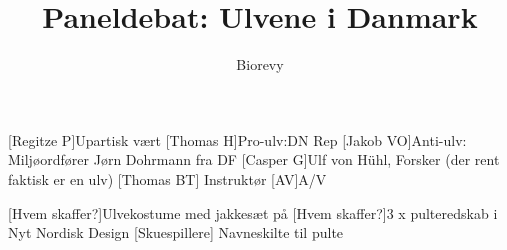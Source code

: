 \documentclass[a4paper,12pt]{article}
\title{Paneldebat: Ulvene i Danmark}
\author{Biorevy}
\begin{document}
\maketitle




\begin{roles}
	[Regitze P]Upartisk vært
	[Thomas H]Pro-ulv:DN Rep
	[Jakob VO]Anti-ulv: Miljøordfører Jørn Dohrmann fra DF
	[Casper G]Ulf von Hühl, Forsker (der rent faktisk er en ulv)
	[Thomas BT] Instruktør
	[AV]A/V
\end{roles}


\begin{props}
	[Hvem skaffer?]Ulvekostume med jakkesæt på
[Hvem skaffer?]3 x pulteredskab i Nyt Nordisk Design
[Skuespillere] Navneskilte til pulte
\end{props}
\end{document}
